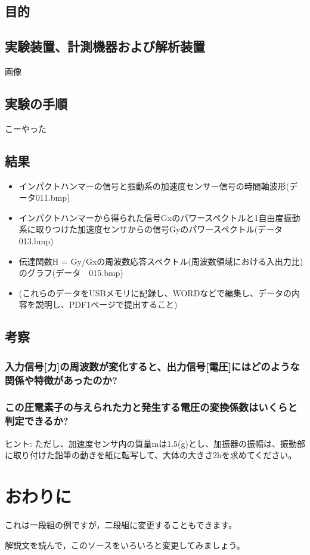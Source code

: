 \documentclass{jsarticle}
\begin{document}
\subsection{目的}
\subsection{実験装置、計測機器および解析装置}
画像
\subsection{実験の手順}
こーやった
\subsection{結果}
\begin{itemize}
	\item インパクトハンマーの信号と振動系の加速度センサー信号の時間軸波形(データ011.bmp)
	\item インパクトハンマーから得られた信号Gxのパワースペクトルと1自由度振動系に取りつけた加速度センサからの信号Gyのパワースペクトル(データ　013.bmp)
	\item 伝達関数H = Gy/Gxの周波数応答スペクトル(周波数領域における入出力比)のグラフ(データ　015.bmp)
	\item (これらのデータをUSBメモリに記録し、WORDなどで編集し、データの内容を説明し、PDF1ページで提出すること)
\end{itemize}
\subsection{考察}
\subsubsection{入力信号[力]の周波数が変化すると、出力信号[電圧]にはどのような関係や特徴があったのか? }
\subsubsection{この圧電素子の与えられた力と発生する電圧の変換係数はいくらと判定できるか? }
ヒント: ただし、加速度センサ内の質量mは1.5(g)とし、加振器の振幅は、振動部に取り付けた鉛筆の動きを紙に転写して、大体の大きさ2hを求めてください。


\section{おわりに}

これは一段組の例ですが，二段組に変更することもできます。

解説文を読んで，このソースをいろいろと変更してみましょう。
\end{document}
